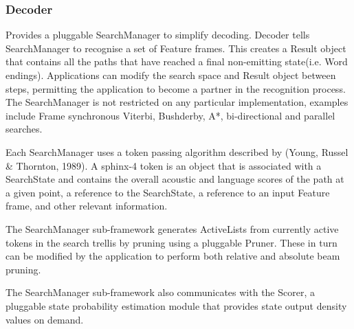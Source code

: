 \subsubsection{Decoder}
Provides a pluggable SearchManager to simplify decoding.  Decoder tells SearchManager to recognise a set of Feature frames. This creates a Result object that contains all the paths that have reached a final non-emitting state(i.e. Word endings).  Applications can modify the search space and Result object between steps, permitting the application to become a partner in the recognition process.  The SearchManager is not restricted on any particular implementation, examples include Frame synchronous Viterbi, Bushderby, A*, bi-directional and parallel searches.

Each SearchManager uses a token passing algorithm described by (Young, Russel & Thornton, 1989).  A sphinx-4 token is an object that is associated with a SearchState and contains the overall acoustic and language scores of the path at a given point, a reference to the SearchState, a reference to an input Feature frame, and other relevant information.

The SearchManager sub-framework generates ActiveLists from currently active tokens in the search trellis by pruning using a pluggable Pruner. These in turn can be modified by the application to perform both relative and absolute beam pruning.

The SearchManager sub-framework also communicates with the Scorer, a pluggable state probability estimation module that provides state output density values on demand.


